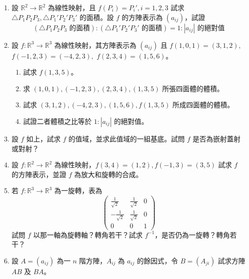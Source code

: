 \begin{enumerate}[label=\arabic*., leftmargin=2em]
  \item 設 $\mathbb{R}^2 \longrightarrow \mathbb{R}^2$ 為線性映射，且 $f(P_i)=P_i', i=1, 2, 3$ 試求 $\triangle P_1P_2P_3, \triangle P_1'P_2'P_3'$ 的面積。設 $f$ 的方陣表示為 $(a_{ij})$，試證
  \[ (\triangle P_1P_2P_3 \text{ 的面積}) : (\triangle P_1'P_2'P_3' \text{ 的面積}) = 1 : |a_{ij}| \text{ 的絕對值} \]

  \item 設 $f: \mathbb{R}^3 \longrightarrow \mathbb{R}^3$ 為線性映射，其方陣表示為 $(a_{ij})$ 且 $f(1, 0, 1) = (3, 1, 2),$ $f(-1, 2, 3) = (-4, 2, 3),$ $f(2, 3, 4) = (1, 5, 6)$。
  \begin{enumerate}[label=(\roman*)]
    \item 試求 $f(1, 3, 5)$。
    \item 求 $(1, 0, 1), (-1, 2, 3), (2, 3, 4), (1, 3, 5)$ 所張四面體的體積。
    \item 試求 $(3, 1, 2), (-4, 2, 3), (1, 5, 6), f(1, 3, 5)$ 所成四面體的體積。
    \item 試證二者體積之比等於 $1 : |a_{ij}|$ 的絕對值。
  \end{enumerate}

  \item[\textbf{*3.}] 設 $f$ 如上，試求 $f$ 的值域，並求此值域的一組基底。試問 $f$ 是否為嵌射蓋射或對射？

  \item 設 $f: \mathbb{R}^2 \longrightarrow \mathbb{R}^2$ 為線性映射，$f(3, 4) = (1, 2), f(-1, 3) = (3, 5)$ 試求 $f$ 的方陣表示，並證 $f$ 為放大和旋轉的合成。

  \item[\textbf{*5.}] 若 $f: \mathbb{R}^3 \longrightarrow \mathbb{R}^3$ 為一旋轉，表為
  \[ \begin{pmatrix}
  \frac{1}{\sqrt{2}} & \frac{1}{\sqrt{2}} & 0 \\
  -\frac{1}{\sqrt{2}} & \frac{1}{\sqrt{2}} & 0 \\
  0 & 0 & 1
  \end{pmatrix} \]
  試問 $f$ 以那一軸為旋轉軸？轉角若干？試求 $f^{-1}$，是否仍為一旋轉？轉角若干？

  \item[\textbf{*6.}] 設 $A=(a_{ij})$ 為一 $n$ 階方陣，$A_{ij}$ 為 $a_{ij}$ 的餘因式，令 $B=(A_{ji})$ 試求方陣 $AB$ 及 $BA$。


\end{enumerate}
